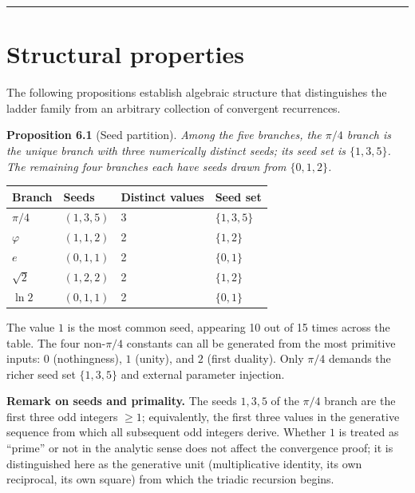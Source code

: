 \documentclass[12pt]{article}
\begin{document}
\begin{center}\rule{0.5\linewidth}{0.5pt}\end{center}

\section{Structural properties}\label{structural-properties}

The following propositions establish algebraic structure that
distinguishes the ladder family from an arbitrary collection of
convergent recurrences.

\textbf{Proposition 6.1} (Seed partition). \emph{Among the five
branches, the \(\pi/4\) branch is the unique branch with three
numerically distinct seeds; its seed set is \(\{1, 3, 5\}\). The
remaining four branches each have seeds drawn from \(\{0, 1, 2\}\).}

\begin{longtable}[]{@{}llll@{}}
\toprule\noalign{}
Branch & Seeds & Distinct values & Seed set \\
\midrule\noalign{}
\endhead
\bottomrule\noalign{}
\endlastfoot
\(\pi/4\) & \((1,3,5)\) & 3 & \(\{1,3,5\}\) \\
\(\varphi\) & \((1,1,2)\) & 2 & \(\{1,2\}\) \\
\(e\) & \((0,1,1)\) & 2 & \(\{0,1\}\) \\
\(\sqrt{2}\) & \((1,2,2)\) & 2 & \(\{1,2\}\) \\
\(\ln 2\) & \((0,1,1)\) & 2 & \(\{0,1\}\) \\
\end{longtable}

The value \(1\) is the most common seed, appearing 10 out of 15 times
across the table. The four non-\(\pi/4\) constants can all be generated
from the most primitive inputs: \(0\) (nothingness), \(1\) (unity), and
\(2\) (first duality). Only \(\pi/4\) demands the richer seed set
\(\{1, 3, 5\}\) and external parameter injection.

\textbf{Remark on seeds and primality.} The seeds \(1, 3, 5\) of the
\(\pi/4\) branch are the first three odd integers \(\geq 1\);
equivalently, the first three values in the generative sequence from
which all subsequent odd integers derive. Whether \(1\) is treated as
``prime'' or not in the analytic sense does not affect the convergence
proof; it is distinguished here as the generative unit (multiplicative
identity, its own reciprocal, its own square) from which the triadic
recursion begins.
\end{document}
